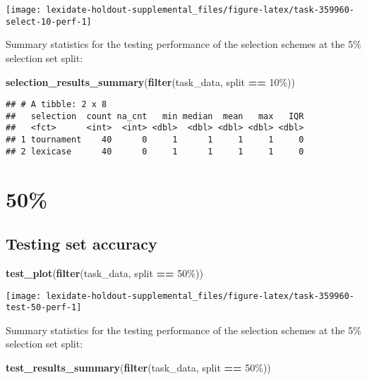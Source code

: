 \documentclass[
]{book}
\newenvironment{Shaded}{\begin{snugshade}}{\end{snugshade}}
\newcommand{\FunctionTok}[1]{\textcolor[rgb]{0.13,0.29,0.53}{\textbf{#1}}}
\newcommand{\NormalTok}[1]{#1}
\newcommand{\SpecialCharTok}[1]{\textcolor[rgb]{0.81,0.36,0.00}{\textbf{#1}}}
\newcommand{\StringTok}[1]{\textcolor[rgb]{0.31,0.60,0.02}{#1}}
\begin{document}
\texttt{[image: lexidate-holdout-supplemental\_files/figure-latex/task-359960-select-10-perf-1]}

Summary statistics for the testing performance of the selection schemes at the 5\% selection set split:

\begin{Shaded}
\begin{Highlighting}[]
\FunctionTok{selection\_results\_summary}\NormalTok{(}\FunctionTok{filter}\NormalTok{(task\_data, split }\SpecialCharTok{==} \StringTok{\textquotesingle{}10\%\textquotesingle{}}\NormalTok{))}
\end{Highlighting}
\end{Shaded}

\begin{verbatim}
## # A tibble: 2 x 8
##   selection  count na_cnt   min median  mean   max   IQR
##   <fct>      <int>  <int> <dbl>  <dbl> <dbl> <dbl> <dbl>
## 1 tournament    40      0     1      1     1     1     0
## 2 lexicase      40      0     1      1     1     1     0
\end{verbatim}

\hypertarget{section-47}{%
\section{50\%}\label{section-47}}

\hypertarget{testing-set-accuracy-47}{%
\subsection{Testing set accuracy}\label{testing-set-accuracy-47}}

\begin{Shaded}
\begin{Highlighting}[]
\FunctionTok{test\_plot}\NormalTok{(}\FunctionTok{filter}\NormalTok{(task\_data, split }\SpecialCharTok{==} \StringTok{\textquotesingle{}50\%\textquotesingle{}}\NormalTok{))}
\end{Highlighting}
\end{Shaded}

\texttt{[image: lexidate-holdout-supplemental\_files/figure-latex/task-359960-test-50-perf-1]}

Summary statistics for the testing performance of the selection schemes at the 5\% selection set split:

\begin{Shaded}
\begin{Highlighting}[]
\FunctionTok{test\_results\_summary}\NormalTok{(}\FunctionTok{filter}\NormalTok{(task\_data, split }\SpecialCharTok{==} \StringTok{\textquotesingle{}50\%\textquotesingle{}}\NormalTok{))}
\end{Highlighting}
\end{Shaded}
\end{document}

